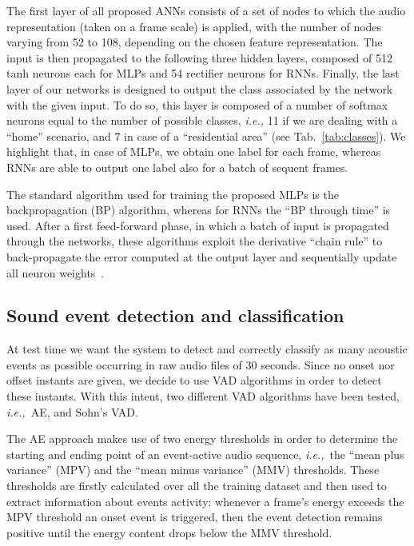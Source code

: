 The first layer of all proposed ANNs consists of a set of nodes to which the audio representation (taken on a frame scale) is applied, with the number of nodes varying from 52 to 108, depending on the chosen feature representation. The input is then propagated to the following three hidden layers, composed of 512 tanh neurons each for MLPs and 54 rectifier neurons for RNNs.  Finally, the last layer of our networks is designed to output the class associated by the network with the given input. To do so, this layer is composed of a number of softmax neurons equal to the number of possible classes, \emph{i.e.,} 11 if we are dealing with a ``home'' scenario, and 7 in case of a ``residential area'' (see Tab.~\ref{tab:classes}). We highlight that, in case of MLPs, we obtain one label for each frame, whereas RNNs are able to output one label also for a batch of sequent frames.

The standard algorithm used for training the proposed MLPs is the backpropagation (BP) algorithm, whereas for RNNs the ``BP through time'' is used. After a first feed-forward phase, in which a batch of input is propagated through the networks, these algorithms exploit the derivative ``chain rule'' to back-propagate the error computed at the output layer and sequentially update all neuron weights~\cite{rojas2013neural}.

\subsection{Sound event detection and classification}

At test time we want the system to detect and correctly classify as many acoustic events as possible occurring in raw audio files of 30 seconds. Since no onset nor offset instants are given, we decide to use VAD algorithms in order to detect these instants. With this intent, two different VAD algorithms have been tested, \emph{i.e.,}\ AE, and Sohn's VAD. 

The AE approach makes use of two energy thresholds in order to determine the starting and ending point of an event-active audio sequence, \emph{i.e.,}\ the ``mean plus variance'' (MPV) and the ``mean minus variance'' (MMV) thresholds. These thresholds are firstly calculated over all the training dataset and then used to extract information about events activity: whenever a frame's energy exceeds the MPV threshold an onset event is triggered, then the event detection remains positive until the energy content drops below the MMV threshold. 

